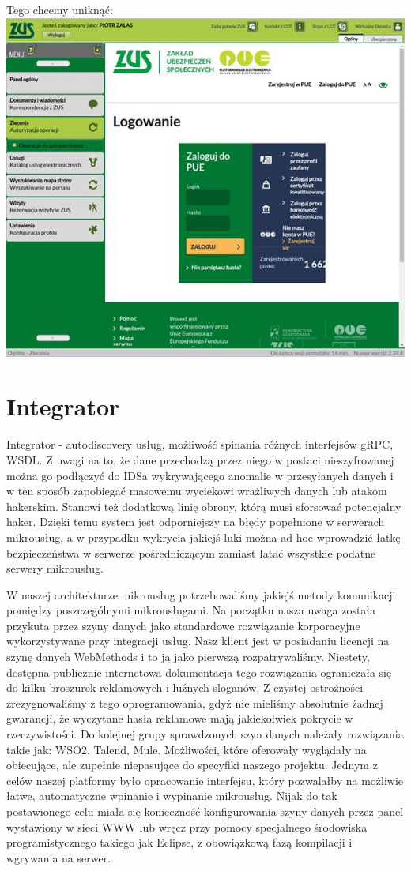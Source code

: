 \documentclass[licencjacka]{pracamgr}
\begin{document}
Tego chcemy uniknąć:\\
\includegraphics[width=\textwidth]{obrazki/logowaniezle.jpg}

\section{Integrator}
Integrator - autodiscovery usług, możliwość spinania różnych interfejsów gRPC, WSDL. 
Z uwagi na to, że dane przechodzą przez niego w postaci nieszyfrowanej można
go podłączyć do IDSa wykrywającego anomalie w przesyłanych danych i w ten sposób
zapobiegać masowemu wyciekowi wrażliwych danych lub atakom hakerskim. Stanowi też
dodatkową linię obrony, którą musi sforsować potencjalny haker. Dzięki temu system jest
odporniejszy na błędy popełnione w serwerach mikrousług, a w przypadku wykrycia
jakiejś luki można ad-hoc wprowadzić łatkę bezpieczeństwa w serwerze pośredniczącym
zamiast łatać wszystkie podatne serwery mikrousług.

W naszej architekturze mikrousług potrzebowaliśmy jakiejś metody komunikacji pomiędzy poszczególnymi mikrousługami.
Na początku nasza uwaga została przykuta przez szyny danych jako standardowe rozwiązanie korporacyjne wykorzystywane
przy integracji usług. Nasz klient jest w posiadaniu licencji na szynę danych WebMethods i to ją jako pierwszą
rozpatrywaliśmy. Niestety, dostępna publicznie internetowa dokumentacja tego rozwiązania ograniczała się do kilku
broszurek reklamowych i luźnych sloganów. Z czystej ostrożności zrezygnowaliśmy z tego oprogramowania, gdyż nie
mieliśmy absolutnie żadnej gwarancji, że wyczytane hasła reklamowe mają jakiekolwiek pokrycie w rzeczywistości.
Do kolejnej grupy sprawdzonych szyn danych należały rozwiązania takie jak: WSO2, Talend, Mule. Możliwości, które
oferowały wyglądały na obiecujące, ale zupełnie niepasujące do specyfiki naszego projektu. Jednym z celów naszej
platformy było opracowanie interfejsu, który pozwalałby na możliwie łatwe, automatyczne wpinanie i wypinanie
mikrousług. Nijak do tak postawionego celu miała się konieczność konfigurowania szyny danych przez panel wystawiony w sieci
WWW lub wręcz przy pomocy specjalnego środowiska programistycznego takiego jak Eclipse, z obowiązkową fazą kompilacji
i wgrywania na serwer. 
\end{document}
